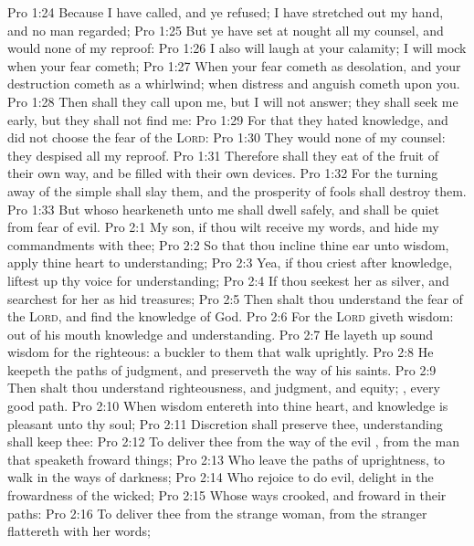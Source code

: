 \vs Pro 1:24 Because I have called, and ye refused; I have stretched out my hand, and no man regarded;
\vs Pro 1:25 But ye have set at nought all my counsel, and would none of my reproof:
\vs Pro 1:26 I also will laugh at your calamity; I will mock when your fear cometh;
\vs Pro 1:27 When your fear cometh as desolation, and your destruction cometh as a whirlwind; when distress and anguish cometh upon you.
\vs Pro 1:28 Then shall they call upon me, but I will not answer; they shall seek me early, but they shall not find me:
\vs Pro 1:29 For that they hated knowledge, and did not choose the fear of the \textsc{Lord}:
\vs Pro 1:30 They would none of my counsel: they despised all my reproof.
\vs Pro 1:31 Therefore shall they eat of the fruit of their own way, and be filled with their own devices.
\vs Pro 1:32 For the turning away of the simple shall slay them, and the prosperity of fools shall destroy them.
\vs Pro 1:33 But whoso hearkeneth unto me shall dwell safely, and shall be quiet from fear of evil.
\vs Pro 2:1 My son, if thou wilt receive my words, and hide my commandments with thee;
\vs Pro 2:2 So that thou incline thine ear unto wisdom,  apply thine heart to understanding;
\vs Pro 2:3 Yea, if thou criest after knowledge,  liftest up thy voice for understanding;
\vs Pro 2:4 If thou seekest her as silver, and searchest for her as  hid treasures;
\vs Pro 2:5 Then shalt thou understand the fear of the \textsc{Lord}, and find the knowledge of God.
\vs Pro 2:6 For the \textsc{Lord} giveth wisdom: out of his mouth  knowledge and understanding.
\vs Pro 2:7 He layeth up sound wisdom for the righteous:  a buckler to them that walk uprightly.
\vs Pro 2:8 He keepeth the paths of judgment, and preserveth the way of his saints.
\vs Pro 2:9 Then shalt thou understand righteousness, and judgment, and equity; , every good path.
\vs Pro 2:10 When wisdom entereth into thine heart, and knowledge is pleasant unto thy soul;
\vs Pro 2:11 Discretion shall preserve thee, understanding shall keep thee:
\vs Pro 2:12 To deliver thee from the way of the evil , from the man that speaketh froward things;
\vs Pro 2:13 Who leave the paths of uprightness, to walk in the ways of darkness;
\vs Pro 2:14 Who rejoice to do evil,  delight in the frowardness of the wicked;
\vs Pro 2:15 Whose ways  crooked, and  froward in their paths:
\vs Pro 2:16 To deliver thee from the strange woman,  from the stranger  flattereth with her words;
